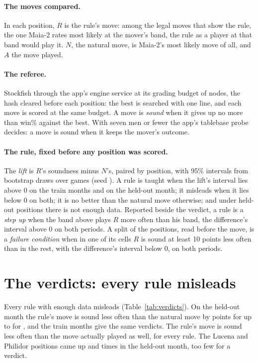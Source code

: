 \documentclass[11pt]{article}
\begin{document}
\paragraph{The moves compared.} In each position, $R$ is the rule's move: among the legal moves
that show the rule, the one Maia-2 rates most likely at the mover's band, the rule as a player at
that band would play it. $N$, the natural move, is Maia-2's most likely move of all, and $A$ the
move played.

\paragraph{The referee.} Stockfish through the app's engine service at its grading budget of
\GradeNodes{} nodes, the hash cleared before each position: the best is searched with one line, and
each move is scored at the same budget. A move is \emph{sound} when it gives up no more than
\Window{} win\% against the best. With seven men or fewer the app's tablebase probe decides: a move
is sound when it keeps the mover's outcome.

\paragraph{The rule, fixed before any position was scored.} The \emph{lift} is $R$'s soundness
minus $N$'s, paired by position, with 95\% intervals from \Draws{} bootstrap draws over games (seed
\Seed). A rule is taught when the lift's interval lies above 0 on the train months and on the
held-out month; it misleads when it lies below 0 on both; it is no better than the natural move
otherwise; and under \MinHeld{} held-out positions there is not enough data. Reported beside the
verdict, a rule is a \emph{step up} when the band above plays $R$ more often than his band, the
difference's interval above 0 on both periods. A split of the positions, read before the move, is a
\emph{failure condition} when in one of its cells $R$ is sound at least 10 points less often than
in the rest, with the difference's interval below 0, on both periods.

\section{The verdicts: every rule misleads}

Every rule with enough data misleads (Table~\ref{tab:verdicts}). On the held-out month the rule's
move is sound less often than the natural move by \LeastLift{} points for \LeastLiftName{} up to
\MostLift{} for \MostLiftName, and the train months give the same verdicts. The rule's move is
sound less often than the move actually played as well, for every rule. The Lucena and Philidor
positions came up \LucenaHeld{} and \PhilidorHeld{} times in the held-out month, too few for a
verdict.
\end{document}
